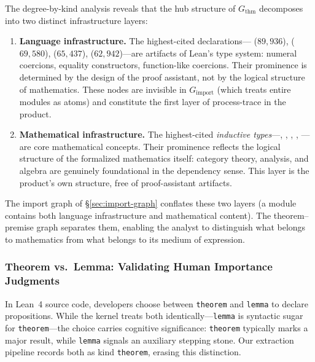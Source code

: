 \begin{remark}
\label{rem:two-layers}
The degree-by-kind analysis reveals that the hub structure of $G_{\mathrm{thm}}$ decomposes into two distinct infrastructure layers:
\begin{enumerate}
\item \textbf{Language infrastructure.} The highest-cited declarations--- ($89{,}936$),  ($69{,}580$),  ($65{,}437$),  ($62{,}942$)---are artifacts of Lean's type system: numeral coercions, equality constructors, function-like coercions. Their prominence is determined by the design of the proof assistant, not by the logical structure of mathematics. These nodes are invisible in $G_{\mathrm{import}}$ (which treats entire modules as atoms) and constitute the first layer of process-trace in the product.

\item \textbf{Mathematical infrastructure.} The highest-cited \emph{inductive types}---, , , , ---are core mathematical concepts. Their prominence reflects the logical structure of the formalized mathematics itself: category theory, analysis, and algebra are genuinely foundational in the dependency sense. This layer is the product's own structure, free of proof-assistant artifacts.
\end{enumerate}
The import graph of \S\ref{sec:import-graph} conflates these two layers (a module contains both language infrastructure and mathematical content). The theorem--premise graph separates them, enabling the analyst to distinguish what belongs to mathematics from what belongs to its medium of expression.
\end{remark}

\subsubsection{Theorem vs.\ Lemma: Validating Human Importance Judgments}
\label{sec:thm-vs-lemma}

In Lean~4 source code, developers choose between \texttt{theorem} and \texttt{lemma} to declare propositions. While the kernel treats both identically---\texttt{lemma} is syntactic sugar for \texttt{theorem}---the choice carries cognitive significance: \texttt{theorem} typically marks a major result, while \texttt{lemma} signals an auxiliary stepping stone. Our extraction pipeline records both as kind \texttt{theorem}, erasing this distinction.

